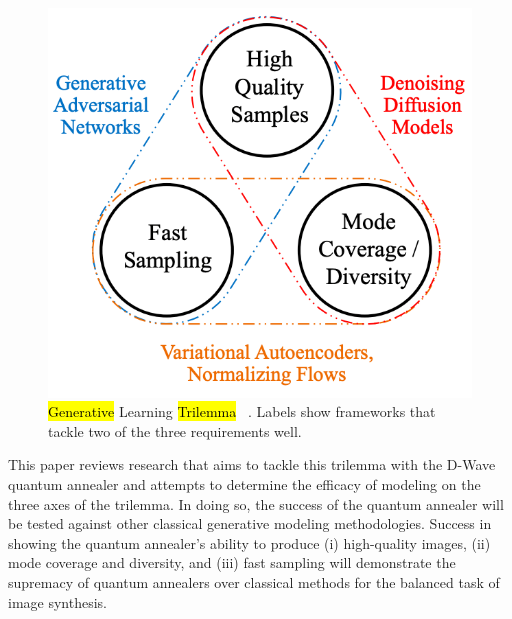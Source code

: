 \documentclass[technologies,article,accept,pdftex,moreauthors]{Definitions/mdpi}
\begin{document}
\begin{figure}[H]
\includegraphics[width=0.9\columnwidth]{trilemma.png}%
\caption{\label{fig:trilemma}\hl{Generative} %
 Learning \hl{Trilemma}%
~\cite{xiao2022DDGAN}. Labels show frameworks that tackle two of the three requirements well.}
\end{figure}

This paper reviews research that aims to tackle this trilemma with the D-Wave quantum annealer and attempts to determine the efficacy of modeling on the three axes of the trilemma. In doing so, the success of the quantum annealer will be tested against other classical generative modeling methodologies. Success in showing the quantum annealer's ability to produce (i) high-quality images, (ii) mode coverage and diversity, and (iii) fast sampling will demonstrate the supremacy of quantum annealers over classical methods for the balanced task of image synthesis.
\end{document}
